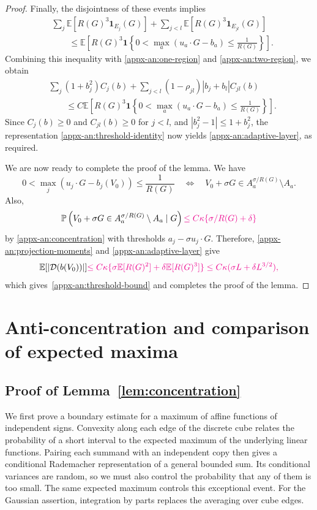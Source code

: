 \documentclass[11pt,letterpaper]{article}
\newcommand{\vSix}[1]{{\color{magenta}#1}}
\theoremstyle{remark}
\newcommand{\E}{\mathbb E}
\newcommand{\Pp}{\mathbb P}
\newcommand{\ind}{\mathbf 1}
\begin{document}
\begin{proof}
Finally, the disjointness of these events implies
\[
\begin{aligned}
&\sum_j\E[R(G)^3\ind_{E_j}(G)]
+\sum_{j<l}\E[R(G)^3\ind_{E_{jl}}(G)]\\
&\qquad\le
\E\left[
R(G)^3\ind\left\{
0<\max_a(u_a\cdot G-b_a)\le\frac1{R(G)}
\right\}\right].
\end{aligned}
\]
Combining this inequality with \eqref{appx-an:one-region}
and \eqref{appx-an:two-region}, we obtain
\[
\begin{aligned}
&\sum_j(1+b_j^2)C_j(b)
+\sum_{j<l}(1-\rho_{jl})|b_j+b_l|C_{jl}(b)\\
&\qquad\le C\E\left[
R(G)^3\ind\left\{
0<\max_a(u_a\cdot G-b_a)\le\frac1{R(G)}
\right\}\right].
\end{aligned}
\]
Since \(C_j(b)\ge0\) and \(C_{jl}(b)\ge0\) for \(j<l\), and
\(|b_j^2-1|\le1+b_j^2\), the representation
\eqref{appx-an:threshold-identity} now yields
\eqref{appx-an:adaptive-layer}, as required.


We are now ready to complete the proof of the lemma. We have
$$
0<\max_j(u_j\cdot G-b_j(V_0))
 \le\frac1{R(G)} \quad \Longleftrightarrow \quad V_0+\sigma G\in A_a^{\sigma/R(G)}\setminus A_a.
$$
Also,
$$
\Pp\left(V_0+\sigma G\in A_a^{\sigma/R(G)}\setminus A_a \mid G\right) \vSix{\leq C\kappa\{\sigma/R(G)+\delta\}}
$$
by \eqref{appx-an:concentration} with thresholds \(a_j-\sigma u_j\cdot G\). Therefore, \eqref{appx-an:projection-moments} and \eqref{appx-an:adaptive-layer}
give
\[
 \E[|\mathcal D(b(V_0))|]
\vSix{\le C\kappa\{\sigma\E[R(G)^2]+\delta\E[R(G)^3]\}
 \le C\kappa(\sigma L+\delta L^{3/2}),}
\]
which gives~\eqref{appx-an:threshold-bound} and completes the proof of the lemma.
\end{proof}
\par\endgroup

\section{Anti-concentration and comparison of expected maxima}\label{appx-app:concentration}
\label{appx-conc:conditioning}

\subsection{Proof of Lemma~\ref*{lem:concentration}}

We first prove a boundary estimate for a maximum of affine functions
of independent signs. Convexity along each edge of the discrete cube
relates the probability of a short interval to the expected maximum
of the underlying linear functions. Pairing each summand with an
independent copy then gives a conditional Rademacher representation
of a general bounded sum. Its conditional variances are random, so
we must also control the probability that any of them is too small.
The same expected maximum controls this exceptional event.
For the Gaussian assertion, integration by parts replaces the
averaging over cube edges.
\end{document}
